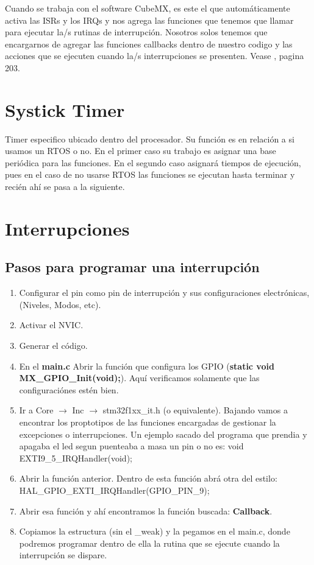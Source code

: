 \documentclass[a4paper,12pt]{report} %
\begin{document}
Cuando se trabaja con el software CubeMX, es este el que automáticamente activa las ISRs y los IRQs y nos agrega las funciones que tenemos que llamar para ejecutar la/s rutinas de interrupción. Nosotros solos tenemos que encargarnos de agregar las funciones callbacks dentro de nuestro codigo y las acciones que se ejecuten cuando la/s interrupciones se presenten. Vease \cite{noviello2017mastering}, pagina 203.

\section{Systick Timer}


Timer especifico ubicado dentro del procesador. Su función es en relación a si usamos un RTOS o no. En el primer caso su trabajo es asignar una base periódica para las funciones. En el segundo caso asignará tiempos de ejecución, pues en el caso de no usarse RTOS las funciones se ejecutan hasta terminar y recién ahí se pasa a la siguiente.

\section{Interrupciones}

\subsection{Pasos para programar una interrupción}

\begin{enumerate}
	\item Configurar el pin como pin de interrupción y sus configuraciones electrónicas, (Niveles, Modos, etc).
	\item Activar el NVIC.
	\item Generar el código.
	\item En el \textbf{main.c} Abrir la función que configura los GPIO (\textbf{static void MX\_GPIO\_Init(void);}). Aquí verificamos solamente que las configuraciónes estén bien.
	\item Ir a Core $\rightarrow$ Inc $\rightarrow$ stm32f1xx\_it.h (o equivalente). Bajando vamos a encontrar los proptotipos de las funciones encargadas de gestionar la excepciones o interrupciones. Un ejemplo sacado del programa que prendia y apagaba el led segun puenteaba a masa un pin o no es: void EXTI9\_5\_IRQHandler(void);
	\item Abrir la función anterior. Dentro de esta función abrá otra del estilo: HAL\_GPIO\_EXTI\_IRQHandler(GPIO\_PIN\_9);
	\item Abrir esa función y ahí encontramos la función buscada: \textbf{Callback}.
	\item Copiamos la estructura (sin el \_weak) y la pegamos en el main.c, donde podremos programar dentro de ella la rutina que se ejecute cuando la interrupción se dispare.
\end{enumerate}
 
\end{document}
